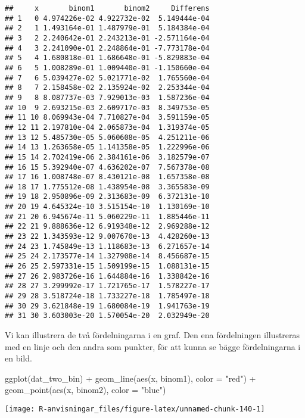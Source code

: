 \documentclass[
]{book}
\newenvironment{Shaded}{\begin{snugshade}}{\end{snugshade}}
\newcommand{\AttributeTok}[1]{\textcolor[rgb]{0.77,0.63,0.00}{#1}}
\newcommand{\FunctionTok}[1]{\textcolor[rgb]{0.00,0.00,0.00}{#1}}
\newcommand{\NormalTok}[1]{#1}
\newcommand{\SpecialCharTok}[1]{\textcolor[rgb]{0.00,0.00,0.00}{#1}}
\newcommand{\StringTok}[1]{\textcolor[rgb]{0.31,0.60,0.02}{#1}}
\theoremstyle{definition}
\theoremstyle{definition}
\theoremstyle{definition}
\theoremstyle{definition}
\theoremstyle{remark}
\begin{document}
\begin{verbatim}
##     x       binom1       binom2     Differens
## 1   0 4.974226e-02 4.922732e-02  5.149444e-04
## 2   1 1.493164e-01 1.487979e-01  5.184384e-04
## 3   2 2.240642e-01 2.243213e-01 -2.571164e-04
## 4   3 2.241090e-01 2.248864e-01 -7.773178e-04
## 5   4 1.680818e-01 1.686648e-01 -5.829883e-04
## 6   5 1.008289e-01 1.009440e-01 -1.150660e-04
## 7   6 5.039427e-02 5.021771e-02  1.765560e-04
## 8   7 2.158458e-02 2.135924e-02  2.253344e-04
## 9   8 8.087737e-03 7.929013e-03  1.587236e-04
## 10  9 2.693215e-03 2.609717e-03  8.349753e-05
## 11 10 8.069943e-04 7.710827e-04  3.591159e-05
## 12 11 2.197810e-04 2.065873e-04  1.319374e-05
## 13 12 5.485730e-05 5.060608e-05  4.251211e-06
## 14 13 1.263658e-05 1.141358e-05  1.222996e-06
## 15 14 2.702419e-06 2.384161e-06  3.182579e-07
## 16 15 5.392940e-07 4.636202e-07  7.567378e-08
## 17 16 1.008748e-07 8.430121e-08  1.657358e-08
## 18 17 1.775512e-08 1.438954e-08  3.365583e-09
## 19 18 2.950896e-09 2.313683e-09  6.372131e-10
## 20 19 4.645324e-10 3.515154e-10  1.130169e-10
## 21 20 6.945674e-11 5.060229e-11  1.885446e-11
## 22 21 9.888636e-12 6.919348e-12  2.969288e-12
## 23 22 1.343593e-12 9.007670e-13  4.428260e-13
## 24 23 1.745849e-13 1.118683e-13  6.271657e-14
## 25 24 2.173577e-14 1.327908e-14  8.456687e-15
## 26 25 2.597331e-15 1.509199e-15  1.088131e-15
## 27 26 2.983726e-16 1.644884e-16  1.338842e-16
## 28 27 3.299992e-17 1.721765e-17  1.578227e-17
## 29 28 3.518724e-18 1.733227e-18  1.785497e-18
## 30 29 3.621848e-19 1.680084e-19  1.941763e-19
## 31 30 3.603003e-20 1.570054e-20  2.032949e-20
\end{verbatim}

Vi kan illustrera de två fördelningarna i en graf. Den ena fördelningen illustreras med en linje och den andra som punkter, för att kunna se bägge fördelningarna i en bild.

\begin{Shaded}
\begin{Highlighting}[]
\FunctionTok{ggplot}\NormalTok{(dat\_two\_bin) }\SpecialCharTok{+}
  \FunctionTok{geom\_line}\NormalTok{(}\FunctionTok{aes}\NormalTok{(x, binom1), }\AttributeTok{color =} \StringTok{"red"}\NormalTok{) }\SpecialCharTok{+}
  \FunctionTok{geom\_point}\NormalTok{(}\FunctionTok{aes}\NormalTok{(x, binom2), }\AttributeTok{color =} \StringTok{"blue"}\NormalTok{)}
\end{Highlighting}
\end{Shaded}

\begin{center}\texttt{[image: R-anvisningar\_files/figure-latex/unnamed-chunk-140-1]} \end{center}
\end{document}

